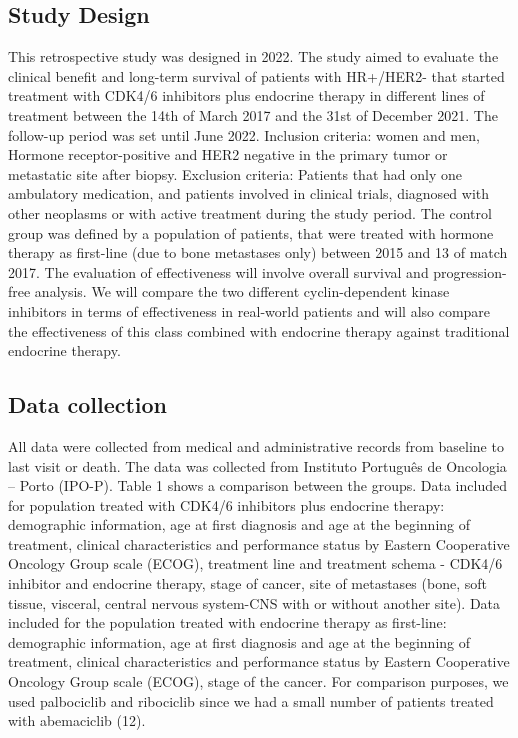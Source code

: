 

\subsection{Study Design}

This retrospective study was designed in 2022. The study aimed to evaluate the clinical benefit and long-term survival of patients with HR+/HER2- that started treatment with CDK4/6 inhibitors plus endocrine therapy in different lines of treatment between the 14th of March 2017 and the 31st of December 2021. The follow-up period was set until June 2022. Inclusion criteria: women and men, Hormone receptor-positive and HER2 negative in the primary tumor or metastatic site after biopsy. Exclusion criteria: Patients that had only one ambulatory medication, and patients involved in clinical trials, diagnosed with other neoplasms or with active treatment during the study period. The control group was defined by a population of patients, that were treated with hormone therapy as first-line (due to bone metastases only) between 2015 and 13 of match 2017.
The evaluation of effectiveness will involve overall survival and progression-free analysis. We will compare the two different cyclin-dependent kinase inhibitors in terms of effectiveness in real-world patients and will also compare the effectiveness of this class combined with endocrine therapy against traditional endocrine therapy.


\subsection{Data collection}
All data were collected from medical and administrative records from baseline to last visit or death. The data was collected from Instituto Português de Oncologia – Porto (IPO-P). Table 1 shows a comparison between the groups.
Data included for population treated with CDK4/6 inhibitors plus endocrine therapy: demographic information, age at first diagnosis and age at the beginning of treatment, clinical characteristics and performance status by Eastern Cooperative Oncology Group scale (ECOG), treatment line and treatment schema - CDK4/6 inhibitor and endocrine therapy, stage of cancer, site of metastases (bone, soft tissue, visceral, central nervous system-CNS with or without another site).
Data included for the population treated with endocrine therapy as first-line: demographic information, age at first diagnosis and age at the beginning of treatment, clinical characteristics and performance status by Eastern Cooperative Oncology Group scale (ECOG), stage of the cancer.
For comparison purposes, we used palbociclib and ribociclib since we had a small number of patients treated with abemaciclib (12).

